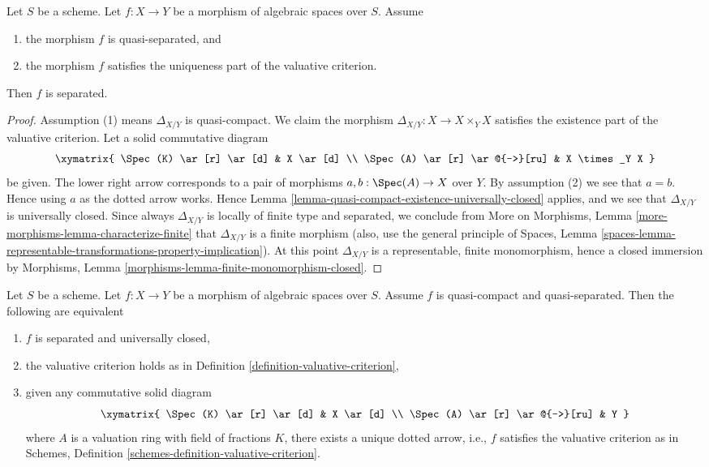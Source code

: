 \begin{lemma}
\label{lemma-valuative-criterion-separatedness}
Let $S$ be a scheme.
Let $f : X \to Y$ be a morphism of algebraic spaces over $S$.
Assume
\begin{enumerate}
\item the morphism $f$ is quasi-separated, and
\item the morphism $f$ satisfies the uniqueness
part of the valuative criterion.
\end{enumerate}
Then $f$ is separated.
\end{lemma}

\begin{proof}
Assumption (1) means $\Delta_{X/Y}$ is quasi-compact.
We claim the morphism
$\Delta_{X/Y} : X \to X \times_Y X$ satisfies the existence
part of the valuative criterion.
Let a solid commutative diagram
$$
\xymatrix{
\Spec(K) \ar[r] \ar[d] & X \ar[d] \\
\Spec(A) \ar[r] \ar@{-->}[ru] & X \times_Y X
}
$$
be given. The lower right arrow corresponds to a
pair of morphisms $a, b : \Spec(A) \to X$ over $Y$.
By assumption (2) we see that $a = b$. Hence using $a$ as the dotted
arrow works. Hence
Lemma \ref{lemma-quasi-compact-existence-universally-closed}
applies, and we see that $\Delta_{X/Y}$ is universally closed.
Since always $\Delta_{X/Y}$ is locally of finite type and
separated, we conclude from
More on Morphisms, Lemma \ref{more-morphisms-lemma-characterize-finite}
that $\Delta_{X/Y}$ is a finite morphism (also, use the
general principle of
Spaces, Lemma
\ref{spaces-lemma-representable-transformations-property-implication}).
At this point $\Delta_{X/Y}$ is a representable, finite monomorphism,
hence a closed immersion by
Morphisms, Lemma \ref{morphisms-lemma-finite-monomorphism-closed}.
\end{proof}

\begin{lemma}
\label{lemma-characterize-separated-and-universally-closed}
Let $S$ be a scheme. Let $f : X \to Y$ be a morphism of algebraic spaces
over $S$. Assume $f$ is quasi-compact and quasi-separated. Then the
following are equivalent
\begin{enumerate}
\item $f$ is separated and universally closed,
\item the valuative criterion holds as in Definition
\ref{definition-valuative-criterion},
\item given any commutative solid diagram
$$
\xymatrix{
\Spec(K) \ar[r] \ar[d] & X \ar[d] \\
\Spec(A) \ar[r] \ar@{-->}[ru] & Y
}
$$
where $A$ is a valuation ring with field of fractions $K$, there exists
a unique dotted arrow, i.e., $f$ satisfies the valuative
criterion as in
Schemes, Definition \ref{schemes-definition-valuative-criterion}.
\end{enumerate}
\end{lemma}

